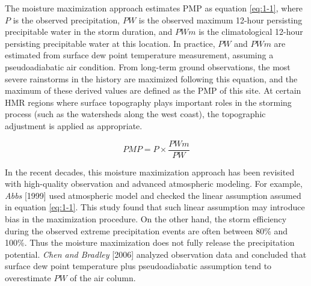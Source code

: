 The moisture maximization approach estimates PMP as equation \ref{eq:1-1}, where $P$ is the observed precipitation, $PW$ is the observed maximum 12-hour persisting precipitable water in the storm duration, and $PWm$ is the climatological 12-hour persisting precipitable water at this location. In practice, $PW$ and $PWm$ are estimated from surface dew point temperature measurement, assuming a pseudoadiabatic air condition. From long-term ground observations, the most severe rainstorms in the history are maximized following this equation, and the maximum of these derived values are defined as the PMP of this site. At certain HMR regions where surface topography plays important roles in the storming process (such as the watersheds along the west coast), the topographic adjustment is applied as appropriate.

\begin{equation}
PMP = P \times{\frac{PWm}{PW}}
\label{eq:1-1}
\end{equation}

In the recent decades, this moisture maximization approach has been revisited with high-quality observation and advanced atmospheric modeling. For example, \textit{Abbs} [1999] used atmospheric model and checked the linear assumption assumed in equation \ref{eq:1-1}. This study found that such linear assumption may introduce bias in the maximization procedure. On the other hand, the storm efficiency during the observed extreme precipitation events are often between 80\% and 100\%. Thus the moisture maximization does not fully release the precipitation potential. \textit{Chen and Bradley} [2006] analyzed observation data and concluded that surface dew point temperature plus pseudoadiabatic assumption tend to overestimate $PW$ of the air column.

